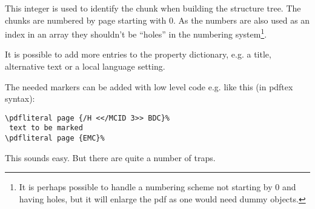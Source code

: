 \documentclass[DIV=12,parskip=half-,bibliography=totoc]{scrartcl}
\begin{document}
\begin{description}
This integer is used to identify the chunk when building the structure tree. The chunks are numbered by page starting with 0. As the numbers are also used as an index in an array they shouldn't be \enquote{holes} in the numbering system\footnote{It is perhaps possible to handle a numbering scheme not starting by 0 and having holes, but it will enlarge the pdf as one would need dummy objects.}.

It is possible to add more entries to the property dictionary, e.g. a title, alternative text or a local language setting.
\end{description}

The needed markers can be added with low level code e.g. like this (in pdftex syntax):

\begin{lstlisting}
\pdfliteral page {/H <</MCID 3>> BDC}%
 text to be marked
\pdfliteral page {EMC}%
\end{lstlisting}

This sounds easy. But there are quite a number of traps.
\end{document}
